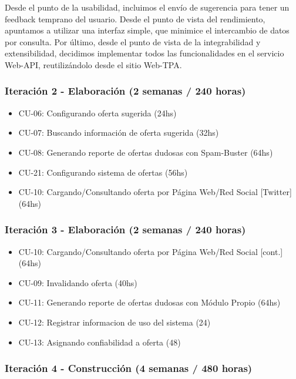 	Desde el punto de la usabilidad, incluimos el env\'io de sugerencia para tener un feedback temprano del usuario. Desde el punto de vista del rendimiento, apuntamos a utilizar una interfaz simple, que minimice el intercambio de datos por consulta. Por \'ultimo, desde el punto de vista de la integrabilidad y extensibilidad, decidimos implementar todos las funcionalidades en el servicio Web-API, reutilizándolo desde el sitio Web-TPA.
	
\subsubsection{Iteraci\'on 2 - Elaboraci\'on (2 semanas / 240 horas)}
	
	\begin{itemize}
	  \item CU-06: Configurando oferta sugerida (24hs)
	  \item CU-07: Buscando información de oferta sugerida (32hs)
	  \item CU-08: Generando reporte de ofertas dudosas con Spam-Buster (64hs)
	  \item CU-21: Configurando sistema de ofertas (56hs)
	  \item CU-10: Cargando/Consultando oferta por P\'agina Web/Red Social [Twitter] (64hs)
	\end{itemize}

\subsubsection{Iteraci\'on 3 - Elaboraci\'on (2 semanas / 240 horas)}
	
	\begin{itemize}
		\item CU-10: Cargando/Consultando oferta por P\'agina Web/Red Social [cont.] (64hs)
		\item CU-09: Invalidando oferta (40hs)
		\item CU-11: Generando reporte de ofertas dudosas con M\'odulo Propio (64hs)
		\item CU-12: Registrar informacion de uso del sistema (24)
		\item CU-13: Asignando confiabilidad a oferta (48)
	\end{itemize}

\subsubsection{Iteraci\'on 4 - Construcci\'on (4 semanas / 480 horas)}
	
